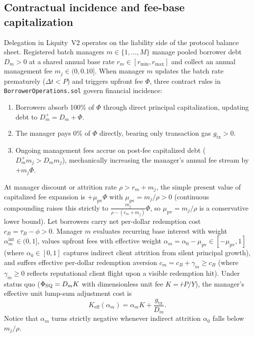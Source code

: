 \subsection{Contractual incidence and fee-base capitalization}\label{subsec:incidence}

Delegation in Liquity~V2 operates on the liability side of the protocol balance sheet. Registered batch managers $m \in \{1, \dots, M\}$ manage pooled borrower debt $D_m > 0$ at a shared annual base rate $r_m \in [r_{\min}, r_{\max}]$ and collect an annual management fee $m_j \in (0, 0.10]$. When manager $m$ updates the batch rate prematurely ($\Delta t < P$) and triggers upfront fee $\Phi$, three contract rules in \texttt{BorrowerOperations.sol} govern financial incidence:
\begin{enumerate}[label=(\roman*), leftmargin=2.2em, itemsep=2pt]
\item Borrowers absorb 100\% of $\Phi$ through direct principal capitalization, updating debt to $D_m^+ = D_m + \Phi$.
\item The manager pays 0\% of $\Phi$ directly, bearing only transaction gas $g_{\mathrm{tx}} > 0$.
\item Ongoing management fees accrue on post-fee capitalized debt ($D_m^+ m_j > D_m m_j$), mechanically increasing the manager's annual fee stream by $+m_j \Phi$.
\end{enumerate}

At manager discount or attrition rate $\rho > r_m + m_j$, the simple present value of capitalized fee expansion is $+\mu_{\mathrm{pv}}\Phi$ with $\mu_{\mathrm{pv}} = m_j/\rho > 0$ (continuous compounding raises this strictly to $\frac{m_j}{\rho - (r_m + m_j)}\Phi$, so $\mu_{\mathrm{pv}} = m_j/\rho$ is a conservative lower bound). Let borrowers carry net per-dollar redemption cost $c_B = \tau_B - \phi > 0$. Manager $m$ evaluates recurring base interest with weight $\alpha_m^{\mathrm{int}} \in (0, 1]$, values upfront fees with effective weight $\alpha_m = \alpha_0 - \mu_{\mathrm{pv}} \in [-\mu_{\mathrm{pv}}, 1]$ (where $\alpha_0 \in [0, 1]$ captures indirect client attrition from silent principal growth), and suffers effective per-dollar redemption aversion $c_m = c_B + \gamma_m \ge c_B$ (where $\gamma_m \ge 0$ reflects reputational client flight upon a visible redemption hit). Under status quo ($\Phi_{\mathrm{SQ}} = D_m K$ with dimensionless unit fee $K = \bar{r}P/Y$), the manager's effective unit lump-sum adjustment cost is
\begin{equation}\label{eq:keff}
K_{\mathrm{eff}}(\alpha_m) = \alpha_m K + \frac{g_{\mathrm{tx}}}{D_m}.
\end{equation}
Notice that $\alpha_m$ turns strictly negative whenever indirect attrition $\alpha_0$ falls below $m_j/\rho$.

